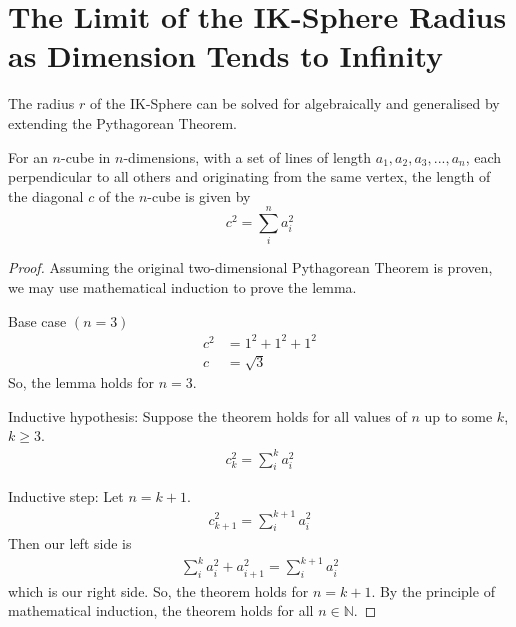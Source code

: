 \section{The Limit of the IK-Sphere Radius as Dimension Tends to Infinity}
The radius $r$ of the IK-Sphere can be solved for algebraically and generalised by extending the Pythagorean Theorem.
\begin{lemma}\label{lemma:extend pythag}
    For an $n$-cube in $n$-dimensions, with a set of lines of length $a_1, a_2, a_3, ... , a_n$, each perpendicular to all others and originating from the same vertex, the length of the diagonal $c$ of the $n$-cube is given by
    \begin{equation}\label{extendedpythag}
        c^2 = \sum_{i}^{n}a_i^2
    \end{equation}
\end{lemma}
\begin{proof}

    Assuming the original two-dimensional Pythagorean Theorem is proven, we may use mathematical induction to prove the lemma.
    
    \noindent 
    Base case $\left(n=3\right)$
    \begin{equation*}
        \begin{split}
            c^2&=1^2+1^2+1^2\\
            c&=\sqrt{3}
        \end{split}
    \end{equation*}
    So, the lemma holds for $n=3$.
    
    \noindent Inductive hypothesis: Suppose the theorem holds for all values of $n$ up to some $k$, $k \geq 3$.
    \begin{equation*}
        \begin{split}
            c_k^2=\sum_{i}^{k}a_i^2
        \end{split}
    \end{equation*}
    
    \noindent Inductive step: Let $n=k+1$. 
    \begin{equation*}
        \begin{split}
        c_{k+1}^2=\sum_{i}^{k+1}a^2_{i}
        \end{split}
    \end{equation*}
    Then our left side is
    \begin{equation*}
        \begin{split}
        \sum_{i}^{k}a_i^2+a_{i+1}^2=\sum_{i}^{k+1}a^2_{i}
        \end{split}
    \end{equation*}
    which is our right side. So, the theorem holds for $n=k+1$. 
    By the principle of mathematical induction, the theorem holds for all $n \in \mathbb{N}$.
\end{proof}
